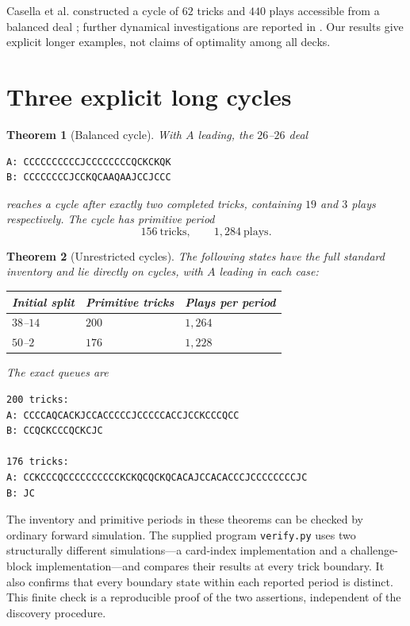 \documentclass[11pt]{article}
\newtheorem{theorem}{Theorem}
\begin{document}
Casella et al. constructed a cycle of $62$ tricks and $440$ plays accessible
from a balanced deal \cite{casella}; further dynamical investigations are
reported in \cite{andorno}. Our results give explicit longer examples, not
claims of optimality among all decks.

\section{Three explicit long cycles}
\begin{theorem}[Balanced cycle]\label{thm:balanced}
With $A$ leading, the $26$--$26$ deal
\begin{verbatim}
A: CCCCCCCCCCJCCCCCCCCQCKCKQK
B: CCCCCCCCJCCKQCAAQAAJCCJCCC
\end{verbatim}
reaches a cycle after exactly two completed tricks, containing $19$ and
$3$ plays respectively. The cycle has primitive period
\[
\boxed{156\ \text{tricks},\qquad 1{,}284\ \text{plays}.}
\]
\end{theorem}
\begin{theorem}[Unrestricted cycles]\label{thm:other}
The following states have the full standard inventory and lie directly
on cycles, with $A$ leading in each case:
\begin{center}
\begin{tabular}{@{}lll@{}}
\toprule
Initial split & Primitive tricks & Plays per period\\
\midrule
$38$--$14$ & $200$ & $1{,}264$\\
$50$--$2$ & $176$ & $1{,}228$\\
\bottomrule
\end{tabular}
\end{center}
The exact queues are
\begin{verbatim}
200 tricks:
A: CCCCAQCACKJCCACCCCCJCCCCCACCJCCKCCCQCC
B: CCQCKCCCQCKCJC

176 tricks:
A: CCKCCCQCCCCCCCCCCKCKQCQCKQCACAJCCACACCCJCCCCCCCCJC
B: JC
\end{verbatim}
\end{theorem}

The inventory and primitive periods in these theorems can be checked by
ordinary forward simulation. The supplied program \texttt{verify.py}
uses two structurally different simulations---a card-index implementation
and a challenge-block implementation---and compares their results at every
trick boundary. It also confirms that every boundary state within each
reported period is distinct. This finite check is a reproducible proof of
the two assertions, independent of the discovery procedure.
\end{document}
